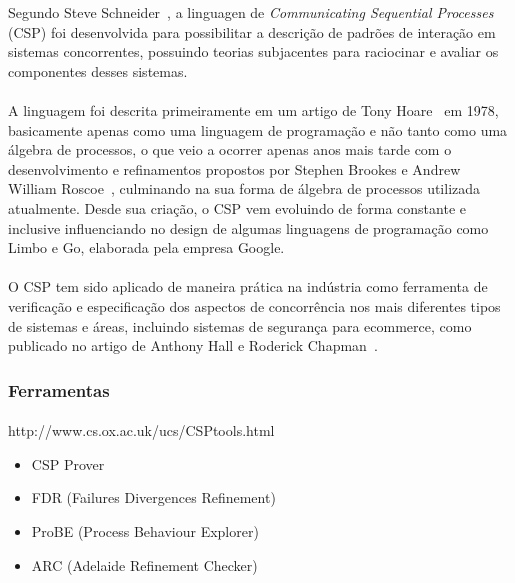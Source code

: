 Segundo Steve Schneider~\cite{Schneider:1999:CRT:555233}, a linguagen de \textit{Communicating Sequential Processes}
(CSP) foi desenvolvida para possibilitar a descrição de padrões de interação em sistemas concorrentes,
possuindo teorias subjacentes para raciocinar e avaliar os componentes desses sistemas.
\paragraph{}
A linguagem foi descrita primeiramente em um artigo de Tony Hoare~\cite{Hoare:1978:CSP:359576.359585} em 1978,
basicamente apenas como uma linguagem de programação e não tanto como uma álgebra de processos, o que veio a ocorrer
apenas anos mais tarde com o desenvolvimento e refinamentos propostos por Stephen Brookes e Andrew William Roscoe~\cite{Brookes:1984:TCS:828.833},
culminando na sua forma de álgebra de processos utilizada atualmente.
Desde sua criação, o CSP vem evoluindo de forma constante e inclusive influenciando no design de algumas linguagens
de programação como Limbo e Go, elaborada pela empresa Google.
\paragraph{}
O CSP tem sido aplicado de maneira prática na indústria como ferramenta de verificação e especificação dos aspectos
de concorrência nos mais diferentes tipos de sistemas e áreas, incluindo sistemas de segurança para ecommerce, como
publicado no artigo de Anthony Hall e Roderick Chapman~\cite{976937}.

\subsubsection{Ferramentas}
\paragraph{}
http://www.cs.ox.ac.uk/ucs/CSPtools.html
\begin{itemize}
\item{CSP Prover}
\item{FDR (Failures Divergences Refinement)}
\item{ProBE (Process Behaviour Explorer)}
\item{ARC (Adelaide Refinement Checker)}
\end{itemize}
